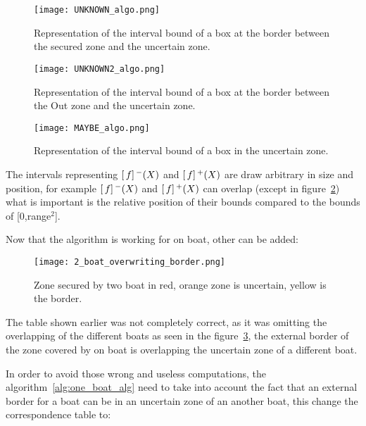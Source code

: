 \begin{figure}[H]
\centering
    \begin{minipage}[b]{0.4\textwidth}
    \texttt{[image: UNKNOWN\_algo.png]}
    \caption{Representation of the interval bound of a box at the border between the secured zone and the uncertain zone.}
    \label{fig:UNKNOWN_algo}
    \end{minipage}
    \begin{minipage}[b]{0.4\textwidth}
    \texttt{[image: UNKNOWN2\_algo.png]}
    \caption{Representation of the interval bound of a box at the border between the Out zone and the uncertain zone.}
    \label{fig:UNKNOWN2_algo}
    \end{minipage}
\end{figure}

\begin{figure}[H]
\centering
    \texttt{[image: MAYBE\_algo.png]}
    \caption{Representation of the interval bound of a box in the uncertain zone.}
    \label{fig:MAYBE_algo}
\end{figure}

The intervals representing $[\,f]\,^{\textnormal{\ensuremath{-}}}(X)$ and $[\,f]\,^{\textnormal{\ensuremath{+}}}(X)$ are draw arbitrary in size and position, for example  $[\,f]\,^{\textnormal{\ensuremath{-}}}(X)$ and $[\,f]\,^{\textnormal{\ensuremath{+}}}(X)$ can overlap (except in figure~\ref{fig:MAYBE_algo}) what is important is the relative position of their bounds compared to the bounds of [0,range$^{2}$].\newline

Now that the algorithm is working for on boat, other can be added:

\begin{figure}[H]
\centering
    \texttt{[image: 2\_boat\_overwriting\_border.png]}
    \caption{Zone secured by two boat in red, orange zone is uncertain, yellow is the border.}
    \label{fig:SecureZoneTwoBoat}
\end{figure}


The table shown earlier was not completely correct, as it was omitting the overlapping of the different boats as seen in the figure~\ref{fig:SecureZoneTwoBoat}, the external border of the zone covered by on boat is overlapping the uncertain zone of a different boat.\newline

In order to avoid those wrong and useless computations, the algorithm~\ref{alg:one_boat_alg} need to take into account the fact that an external border for a boat can be in an uncertain zone of an another boat, this change the correspondence table to:

